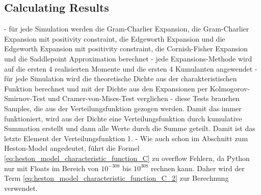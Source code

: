 \subsection{Calculating Results}
- für jede Simulation werden die Gram-Charlier Expansion, die Gram-Charlier Expansion mit positivity constraint, die Edgeworth Expansion und die Edgeworth Expansion mit positivity constraint, die Cornish-Fisher Expansion und die Saddlepoint Approximation berechnet
- jede Expansions-Methode wird auf die ersten 4 realisierten Momente und die ersten 4 Kumulanten angewendet
- für jede Simulation wird die theoretische Dichte aus der charakteristischen Funktion berechnet und mit der Dichte aus den Expansionen per Kolmogorov-Smirnov-Test und Cramer-von-Mises-Test verglichen
- diese Tests brauchen Samples, die aus der Verteilungsfunktion gezogen werden. Damit das immer funktioniert, wird aus der Dichte eine Verteilungsfunktion durch kumulative Summation erstellt und dann alle Werte durch die Summe geteilt. Damit ist das letzte Element der Verteilungsfunktion 1.
- Wie auch schon im Abschnitt zum Heston-Model angedeutet, führt die Formel \eqref{eq:heston_model_characteristic_function_C} zu overflow Fehlern, da Python nur mit Floats im Bereich von $10^{-308}$ bis $10^{308}$ rechnen kann. Daher wird der Term \eqref{eq:heston_model_characteristic_function_C_2} zur Berechnung verwendet.